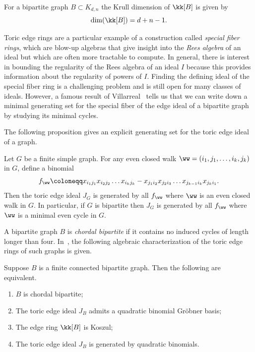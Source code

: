 \begin{cor}\label{cor: krulldim}
For a bipartite graph $B \subset K_{d,n}$ the Krull dimension of $\kk[B]$ is given by
\[\dim(\kk[B]) = d+n-1.\]
\end{cor}

Toric edge rings are a particular example of a construction called \textit{special fiber rings}, which are blow-up algebras that give insight into the \textit{Rees algebra} of an ideal but which are often more tractable to compute.
In general, there is interest in bounding the regularity of the Rees algebra of an ideal $I$ because this provides information about the regularity of powers of $I$.
Finding the defining ideal of the special fiber ring is a challenging problem and is still open for many classes of ideals. 
However, a famous result of Villarreal~\cite{villarreal1995rees} tells us that we can write down a minimal generating set for the special fiber of the edge ideal of a bipartite graph by studying its minimal cycles.

The following proposition gives an explicit generating set for the toric edge ideal of a graph.

\begin{prop}\label{prop: villarreal}\cite[Proposition 3.1]{villarreal1995rees} Let $G$ be a finite simple graph.
For any even closed walk $\ww = (i_1,j_1,\dots, i_k,j_k)$
in $G$, define a binomial
$$
f_\ww \coloneqq
x_{i_1 j_1} x_{i_2 j_2} \dots x_{i_{k} j_{k}} - x_{j_1 i_2} x_{j_2 i_3} \dots x_{j_{k-1} i_k} x_{j_k i_1}.
$$
Then the toric edge ideal $J_G$ is generated by all $f_\ww$ where $\ww$ is an even closed walk in $G$. In particular, if $G$ is bipartite then $J_G$ is generated by all $f_\ww$ where $\ww$ is a minimal even cycle in $G$.
\end{prop}

A bipartite graph $B$ is \emph{chordal bipartite} if it contains no induced cycles of length longer than four. In~\cite{ohsugihibikoszul1999}, the following algebraic characterization of the toric edge rings of such graphs is given.

\begin{theorem}\cite{ohsugihibikoszul1999} \label{thm: chordalbip}
Suppose $B$ is a finite connected bipartite graph. Then the following are equivalent.

\begin{enumerate}
    
    \item
    $B$ is chordal bipartite;
    \item
    The toric edge ideal $J_B$ admits a quadratic binomial  Gr\"obner basis;
    \item
    The edge ring $\kk[B]$ is Koszul;
    \item
    The toric edge ideal $J_B$ is generated by quadratic binomials.
    \end{enumerate}

\end{theorem}    

